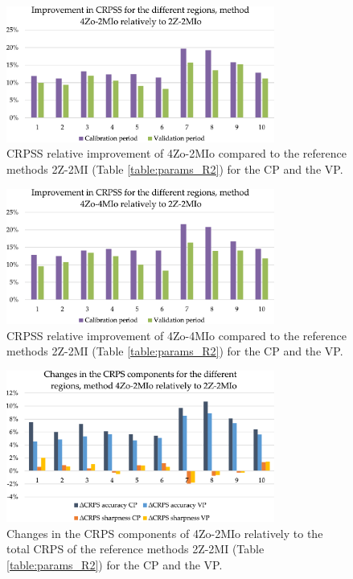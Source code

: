 \documentclass[review]{elsarticle}
\begin{document}
\begin{figure}[htb]
	\centerline{\includegraphics[width=8.8cm]{figures/fig08.pdf}}
	\caption{CRPSS relative improvement of 4Zo-2MIo compared to the reference methods 2Z-2MI (Table \ref{table:params_R2}) for the CP and the VP.}
	\label{fig:figure_dcrpss_4Zo-2HIo}
\end{figure}

\begin{figure}[htb]
	\centerline{\includegraphics[width=8.8cm]{figures/fig09.pdf}}
	\caption{CRPSS relative improvement of 4Zo-4MIo compared to the reference methods 2Z-2MI (Table \ref{table:params_R2}) for the CP and the VP.}
	\label{fig:figure_dcrpss_4Zo-4HIo}
\end{figure}

\begin{figure}[htb]
	\centerline{\includegraphics[width=8.8cm]{figures/fig10.pdf}}
	\caption{Changes in the CRPS components of 4Zo-2MIo relatively to the total CRPS of the reference methods 2Z-2MI (Table \ref{table:params_R2}) for the CP and the VP.}
	\label{fig:figure_dcrps_comp_4Zo-2HIo}
\end{figure}
\end{document}
